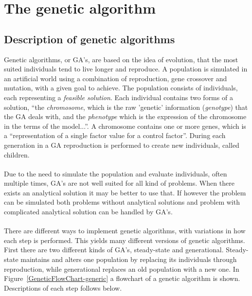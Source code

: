 \section{The genetic algorithm}
\subsection{Description of genetic algorithms}
Genetic algorithms, or GA's, are based on the idea of evolution, that the most suited individuals tend to live longer and reproduce. A population is simulated in an artificial world using a combination of reproduction, gene crossover and mutation, with a given goal to achieve. The population consists of individuals, each representing a \emph{feasible  solution}. Each individual contains two forms of a solution, ``the \textit{chromosome}, which is the raw 'genetic' information (\textit{genotype}) that the GA deals with, and the \textit{phenotype} which is the expression of the chromosome in the terms of the model...''\cite{GAHandbook1}. %
A chromosome contains one or more genes, which is a ``representation of a single factor value for a control factor''\cite{GAHandbook1}. %
During each generation in a GA reproduction is performed to create new individuals, called children.\\\\
Due to the need to simulate the population and evaluate individuals, often multiple times, GA's are not well suited for all kind of problems. When there exists an analytical solution it may be better to use that. %
If however the problem can be simulated both problems without analytical solutions and problem with complicated analytical solution can be handled by GA's.\\\\
There are different ways to implement genetic algorithms, with variations in how each step is performed. This yields many different versions of genetic algorithms. First there are two different kinds of GA's, steady-state and generational. Steady-state maintains and alters one population by replacing its individuals through reproduction, while generational replaces an old population with a new one. In Figure~\ref{GeneticFlowChart-generic} a flowchart of a genetic algorithm is shown. Descriptions of each step follows below.\\\\
